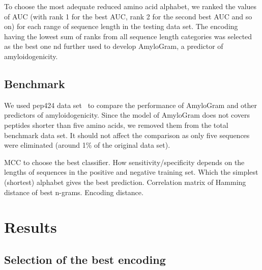 \documentclass{bioinfo}
\begin{document}
\begin{methods}
To choose the most adequate reduced amino acid alphabet, we ranked the values of AUC (with rank 1 for the best AUC, rank 2 for the second best AUC and so on) for each range of sequence length in the testing data set. The encoding having the lowest sum of ranks from all sequence length categories was selected as the best one nd further used to develop AmyloGram, a predictor of amyloidogenicity.

\subsection{Benchmark}

We used pep424 data set~\cite{walsh_pasta_2014} to compare the performance of AmyloGram and other predictors of amyloidogenicity. Since the model of AmyloGram does not covers peptides shorter than five amino acids, we removed them from the total benchmark data set. It should not affect the comparison as only five sequences were eliminated (around 1\% of the original data set).

MCC to choose the best classifier.
How sensitivity/specificity depends on the lengths of sequences in the positive and negative training set.
Which the simplest (shortest) alphabet gives the best prediction.
Correlation matrix of Hamming distance of best n-grams.
Encoding distance.

\end{methods}

\section{Results}

\subsection{Selection of the best encoding}
\end{document}
